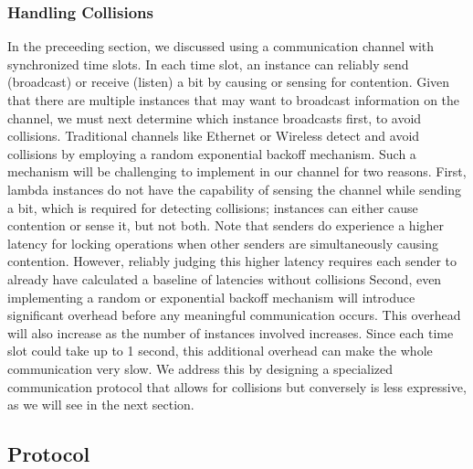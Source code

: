 \subsubsection{Handling Collisions}
In the preceeding section, we discussed using a communication channel with
synchronized time slots. In each time slot, an instance can reliably send
(broadcast) or receive (listen) a bit by causing or sensing for contention.
Given that there are multiple instances that may want to broadcast information
on the channel, we must next determine which instance broadcasts first, to avoid
collisions. Traditional channels like Ethernet or Wireless detect and avoid
collisions by employing a random exponential backoff mechanism.  Such a
mechanism will be challenging to implement in our channel for two
reasons. First, lambda instances do not have the capability of sensing the
channel while sending a bit, which is required for detecting collisions;
instances can either cause contention or sense it, but not both. Note that
senders do experience a higher latency for locking operations when other senders
are simultaneously causing contention. However, reliably judging this higher
latency requires each sender to already have calculated a baseline of latencies
without collisions%
Second, even implementing a random or exponential backoff mechanism
will introduce significant overhead before any meaningful communication occurs.
This overhead will also increase as the number of instances involved increases.
Since each time slot could take up to 1 second, this additional overhead can
make the whole communication very slow. We address this by designing a 
specialized communication protocol that allows for collisions but conversely is
less expressive, as we will see in the next section.



\subsection{Protocol}
\label{sec:protocol}


